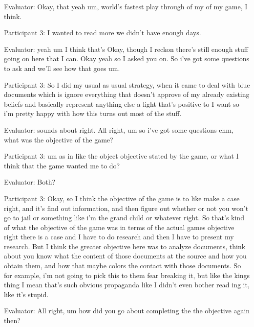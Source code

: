 \documentclass{l4proj}
\begin{document}
\begin{appendices}
Evaluator: Okay, that yeah um, world's fastest play through of my of my game, I think.

Participant 3: I wanted to read more we didn't have enough days.

Evaluator: yeah um I think that's Okay, though I reckon there's still enough stuff going on here that I can. Okay yeah so I asked you on. So i've got some questions to ask and we'll see how that goes um.

Participant 3: So I did my usual as usual strategy, when it came to deal with blue documents which is ignore everything that doesn't approve of my already existing beliefs and basically represent anything else a light that's positive to I want so i'm pretty happy with how this turns out most of the stuff.

Evaluator: sounds about right. All right, um so i've got some questions ehm, what was the objective of the game?

Participant 3: um as in like the object objective stated by the game, or what I think that the game wanted me to do?

Evaluator: Both?

Participant 3: Okay, so I think the objective of the game is to like make a case right, and it's find out information, and then figure out whether or not you won’t go to jail or something like i'm the grand child or whatever right. So that's kind of what the objective of the game was in terms of the actual games objective right there is a case and I have to do research and then I have to present my research. But I think the greater objective here was to analyze documents, think about you know what the content of those documents at the source and how you obtain them, and how that maybe colors the contact with those documents. So for example, i'm not going to pick this to them fear breaking it, but like the kings thing I mean that's such obvious propaganda like I didn't even bother read ing it, like it’s stupid.

Evaluator: All right, um how did you go about completing the the objective again then?


\end{appendices}
\end{document}
